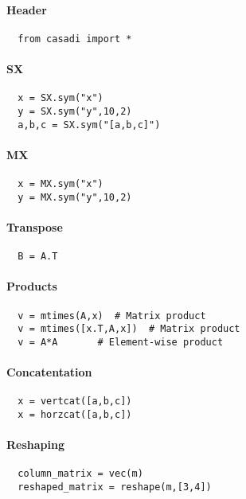 \documentclass[a4paper,8pt]{article}
\begin{document}
\begin{multicols}{2}

\paragraph{Header}
\begin{verbatim}
  from casadi import *
\end{verbatim}

\paragraph{SX}
\begin{verbatim}
  x = SX.sym("x")
  y = SX.sym("y",10,2)
  a,b,c = SX.sym("[a,b,c]")
\end{verbatim}

\paragraph{MX}
\begin{verbatim}
  x = MX.sym("x")
  y = MX.sym("y",10,2)
\end{verbatim}

\paragraph{Transpose}
\begin{verbatim}
  B = A.T
\end{verbatim}

\paragraph{Products}
\begin{verbatim}
  v = mtimes(A,x)  # Matrix product
  v = mtimes([x.T,A,x])  # Matrix product
  v = A*A       # Element-wise product
\end{verbatim}

\paragraph{Concatentation}
\begin{verbatim}
  x = vertcat([a,b,c])
  x = horzcat([a,b,c])
\end{verbatim}

\paragraph{Reshaping}
\begin{verbatim}
  column_matrix = vec(m)
  reshaped_matrix = reshape(m,[3,4])
\end{verbatim}


\end{multicols}
\end{document}
